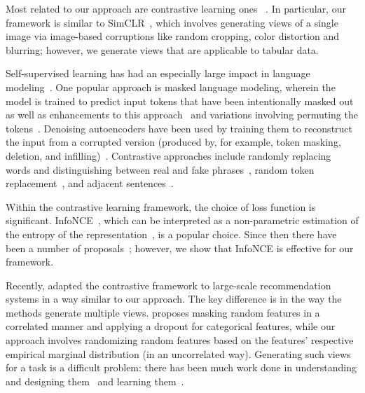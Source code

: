 Most related to our approach are contrastive learning ones ~\citep{tian2019contrastive,hassani2020contrastive,oord2018representation,henaff2020data,li2016unsupervised,he2020momentum,bojanowski2017unsupervised,wang2015unsupervised,gidaris2018unsupervised}. In particular, our framework is similar to SimCLR~\citep{chen2020simple}, which involves generating views of a single image via image-based corruptions like random cropping, color distortion and blurring; however, we generate views that are applicable to tabular data.

Self-supervised learning has had an especially large impact in language modeling~\citep{qiu2020pre}. One popular approach is masked language modeling, wherein the model is trained to predict input tokens that have been intentionally masked out~\citep{devlin2018bert,raffel2019exploring,song2019mass} as well as enhancements to this approach~\citep{liu2019roberta,dong2019unified,bao2020unilmv2,lample2019cross,joshi2020spanbert} and variations involving permuting the tokens~\citep{yang2019xlnet,song2020mpnet}. Denoising autoencoders have been used by training them to reconstruct the input from a corrupted version (produced by, for example, token masking, deletion, and infilling)~\citep{lewis2019bart,wang2019denoising,freitag2018unsupervised}. Contrastive approaches include randomly replacing words and distinguishing between real and fake phrases~\citep{collobert2011natural,mnih2013learning}, random token replacement~\citep{mikolov2013distributed,clark2020electra}, and adjacent sentences~\citep{joshi2020spanbert,lan2019albert,de2019bertje}.

Within the contrastive learning framework, the choice of loss function is significant. InfoNCE~\citep{gutmann2010noise,oord2018representation}, which can be interpreted as a non-parametric estimation of the entropy of the representation~\citep{wang2020understanding}, is a popular choice. Since then there have been a number of proposals~\citep{zbontar2021barlow,grill2020bootstrap,hjelm2018learning}; however, we show that InfoNCE is effective for our framework.

Recently, \citet{yao2020self} adapted the contrastive framework to large-scale recommendation systems in a way similar to our approach. The key difference is in the way the methods generate multiple views. \citet{yao2020self} proposes masking random features in a correlated manner and applying a dropout for categorical features, while our approach involves randomizing random features based on the features' respective empirical marginal distribution (in an uncorrelated way). Generating such views for a task is a difficult problem: there has been much work done in understanding and designing them~\citep{wu2018unsupervised,purushwalkam2020demystifying,gontijo2020affinity,lopes2019improving,perez2017effectiveness,park2019specaugment} and learning them~\citep{ratner2017learning,cubuk2020randaugment,ho2019population,lim2019fast,zhang2019adversarial,tran2017bayesian,tamkin2020viewmaker}. 

